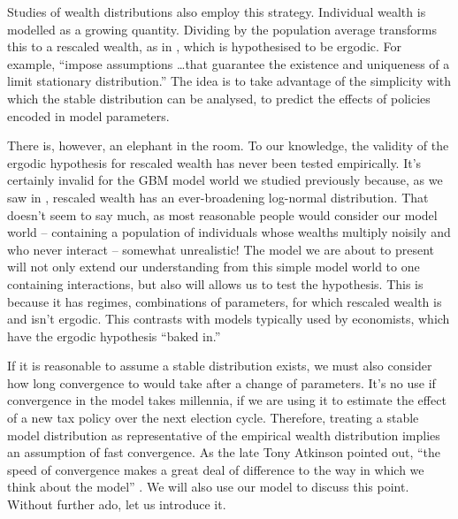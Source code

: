 Studies of wealth distributions also employ this strategy. Individual wealth is modelled as a growing quantity. Dividing by the population average transforms this to a rescaled wealth, as in , which is hypothesised to be ergodic. For example, \cite[p.~130]{BenhabibBisinZhu2011} ``impose assumptions \dots that guarantee the existence and uniqueness of a limit stationary distribution.'' The idea is to take advantage of the simplicity with which the stable distribution can be analysed, \eg to predict the effects of policies encoded in model parameters.

There is, however, an elephant in the room. To our knowledge, the validity of the ergodic hypothesis for rescaled wealth has never been tested empirically. It's certainly invalid for the GBM model world we studied previously because, as we saw in , rescaled wealth has an ever-broadening log-normal distribution. That doesn't seem to say much, as most reasonable people would consider our model world -- containing a population of individuals whose wealths multiply noisily and who never interact -- somewhat unrealistic! The model we are about to present will not only extend our understanding from this simple model world to one containing interactions, but also will allows us to test the hypothesis. This is because it has regimes, \ie combinations of parameters, for which rescaled wealth is and isn't ergodic. This contrasts with models typically used by economists, which have the ergodic hypothesis ``baked in.''

If it is reasonable to assume a stable distribution exists, we must also consider how long convergence to would take after a change of parameters. It's no use if convergence in the model takes millennia, if we are using it to estimate the effect of a new tax policy over the next election cycle. Therefore, treating a stable model distribution as representative of the empirical wealth distribution implies an assumption of fast convergence.  As the late Tony Atkinson pointed out, ``the speed of convergence makes a great deal of difference to the way in which we think about the model'' \cite{atkinson1969timescale}. We will also use our model to discuss this point. Without further ado, let us introduce it.


